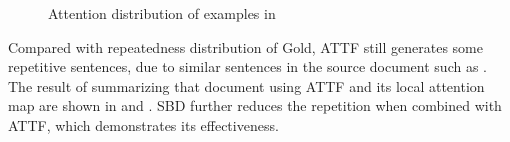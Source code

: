 \begin{figure}[th!]
\centering
{}
\quad
{}
\quad
{}
\quad
{}
\caption{Attention distribution of examples in }
\label{fig:attn_maps}
\end{figure}

Compared with repeatedness distribution of Gold,
ATTF still generates some repetitive sentences,
due to similar sentences in the source document
such as .
The result of summarizing that document using ATTF and its
local attention map are
shown in  and .
SBD further reduces the repetition when combined with ATTF, 
which demonstrates its effectiveness.

